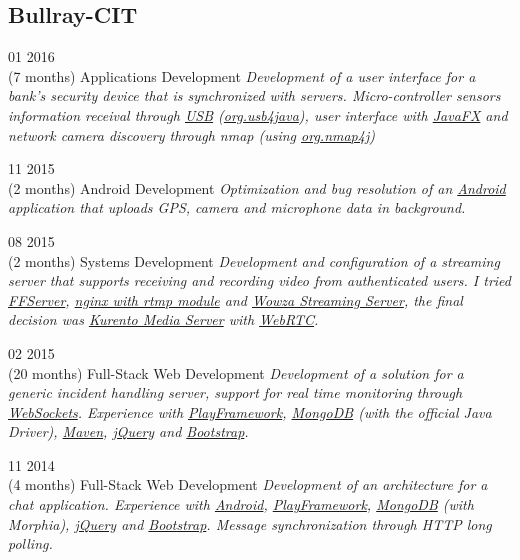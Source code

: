 \documentclass[]{friggeri-cv}
\begin{document}
	\subsection{Bullray-CIT}  
		\begin{entrylist}
			\entry
			{01 2016\\(7 months)}
			{Applications Development}
			{}			
			{\emph{Development of a user interface for a bank's security device that is synchronized with servers. Micro-controller sensors information receival through \underline{USB} (\underline{org.usb4java}), user interface with \underline{JavaFX} and network camera discovery through nmap (using \underline{org.nmap4j}) } }

			\entry
			{11 2015\\(2 months)}
			{Android Development}
			{}
			{\emph{Optimization and bug resolution of an \underline{Android} application that uploads GPS, camera and microphone data in background.}}


			\entry
			{08 2015\\(2 months)}
			{Systems Development}
			{}
			{\emph{Development and configuration of a streaming server that supports receiving and recording video from authenticated users. I tried \underline{FFServer}, \underline{nginx with rtmp module} and \underline{Wowza Streaming Server}, the final decision was \underline{Kurento Media Server} with \underline{WebRTC}. }}

			\entry
			{02 2015\\(20 months)}
			{Full-Stack Web Development}
			{}
			{\emph{Development of a solution for a generic incident handling server, support for real time monitoring through \underline{WebSockets}. Experience with \underline{PlayFramework}, \underline{MongoDB} (with the official Java Driver), \underline{Maven}, \underline{jQuery} and \underline{Bootstrap}.}}

			\entry
			{11 2014\\(4 months)}
			{Full-Stack Web Development}
			{}
			{\emph{Development of an architecture for a chat application. Experience with \underline{Android}, \underline{PlayFramework}, \underline{MongoDB} (with Morphia), \underline{jQuery} and \underline{Bootstrap}. Message synchronization through HTTP long polling.}}
			
	
		\end{entrylist}
\newpage
\end{document}
